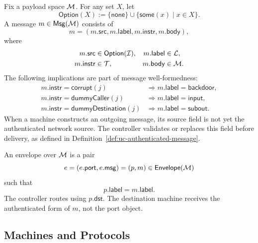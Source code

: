 \begin{definition}[Messages]
\label{def:uc-message}
\leanok
Fix a payload space \(\mathcal{M}\).  For any set \(X\), let
\[
  \mathsf{Option}(X):=
  \{\mathsf{none}\}\cup\{\mathsf{some}(x)\mid x\in X\}.
\]
A message \(m\in\mathsf{Msg}(\mathcal{M})\) consists of
\[
  m=(m.\mathsf{src},m.\mathsf{label},m.\mathsf{instr},m.\mathsf{body}),
\]
where
\[
\begin{aligned}
  m.\mathsf{src}&\in\mathsf{Option}(\mathcal{I}),
  &m.\mathsf{label}&\in\mathcal{L},\\
  m.\mathsf{instr}&\in\mathcal{T},
  &m.\mathsf{body}&\in\mathcal{M}.
\end{aligned}
\]
The following implications are part of message well-formedness:
\[
\begin{aligned}
  m.\mathsf{instr}=\mathsf{corrupt}(j)
    &\Longrightarrow m.\mathsf{label}=\mathsf{backdoor},\\
  m.\mathsf{instr}=\mathsf{dummyCaller}(j)
    &\Longrightarrow m.\mathsf{label}=\mathsf{input},\\
  m.\mathsf{instr}=\mathsf{dummyDestination}(j)
    &\Longrightarrow m.\mathsf{label}=\mathsf{subout}.
\end{aligned}
\]
When a machine constructs an outgoing message, its source field is not yet the
authenticated network source.  The controller validates or replaces this field
before delivery, as defined in
Definition~\ref{def:uc-authenticated-message}.
\end{definition}

\begin{definition}[Envelopes]
\label{def:uc-envelope}
\leanok
An envelope over \(\mathcal{M}\) is a pair
\[
  e=(e.\mathsf{port},e.\mathsf{msg})=(p,m)
  \in\mathsf{Envelope}(\mathcal{M})
\]
such that
\[
  p.\mathsf{label}=m.\mathsf{label}.
\]
The controller routes using \(p.\mathsf{dst}\).  The destination machine
receives the authenticated form of \(m\), not the port object.
\end{definition}

\subsection{Machines and Protocols}

